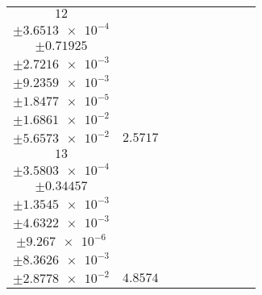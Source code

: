 \documentclass[8pt]{article}
\begin{document}
\begin{longtable}[l]{c c c c c c c c c}
$\num{12}$ & \begin{tabular}[c]{@{}c@{}}$\num{2.9668e-2}$ \\ $\pm\num{3.6513e-4}$\end{tabular} & \begin{tabular}[c]{@{}c@{}}$\num{-0.20158}$ \\ $\pm\num{0.71925}$\end{tabular} & \begin{tabular}[c]{@{}c@{}}$\num{0.90973}$ \\ $\pm\num{2.7216e-3}$\end{tabular} & \begin{tabular}[c]{@{}c@{}}$\num{2.1443e+3}$ \\ $\pm\num{9.2359e-3}$\end{tabular} & \begin{tabular}[c]{@{}c@{}}$\num{4.2898}$ \\ $\pm\num{1.8477e-5}$\end{tabular} & \begin{tabular}[c]{@{}c@{}}$\num{1.1585}$ \\ $\pm\num{1.6861e-2}$\end{tabular} & \begin{tabular}[c]{@{}c@{}}$\num{4.1524}$ \\ $\pm\num{5.6573e-2}$\end{tabular} & $\num{2.5717}$\\
$\num{13}$ & \begin{tabular}[c]{@{}c@{}}$\num{6.0381e-2}$ \\ $\pm\num{3.5803e-4}$\end{tabular} & \begin{tabular}[c]{@{}c@{}}$\num{8.797e-3}$ \\ $\pm\num{0.34457}$\end{tabular} & \begin{tabular}[c]{@{}c@{}}$\num{4.2321}$ \\ $\pm\num{1.3545e-3}$\end{tabular} & \begin{tabular}[c]{@{}c@{}}$\num{2.1476e+3}$ \\ $\pm\num{4.6322e-3}$\end{tabular} & \begin{tabular}[c]{@{}c@{}}$\num{4.2965}$ \\ $\pm\num{9.267e-6}$\end{tabular} & \begin{tabular}[c]{@{}c@{}}$\num{1.1762}$ \\ $\pm\num{8.3626e-3}$\end{tabular} & \begin{tabular}[c]{@{}c@{}}$\num{4.2332}$ \\ $\pm\num{2.8778e-2}$\end{tabular} & $\num{4.8574}$\\

\end{longtable}
\end{document}
